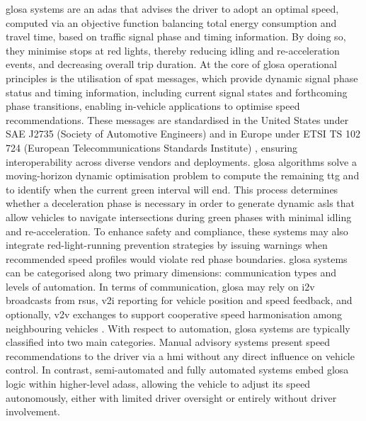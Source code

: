 \ac{glosa} systems are an \ac{adas} that advises the driver to adopt an optimal speed, computed via an objective function balancing total energy consumption and travel time, based on traffic signal phase and timing information. By doing so, they minimise stops at red lights, thereby reducing idling and re-acceleration events, and decreasing overall trip duration. \cite{RealTimeGLOSA2020}
\mynewline
At the core of \ac{glosa} operational principles is the utilisation of \ac{spat} messages, which provide dynamic signal phase status and timing information, including current signal states and forthcoming phase transitions, enabling in-vehicle applications to optimise speed recommendations. These messages are standardised in the United States under SAE J2735 (Society of Automotive Engineers) \cite{USDOTSPaT2022} and in Europe under ETSI TS 102 724 (European Telecommunications Standards Institute) \cite{ETSI1027242012}, ensuring interoperability across diverse vendors and deployments. \ac{glosa} algorithms solve a moving-horizon dynamic optimisation problem to compute the remaining \ac{ttg} and to identify when the current green interval will end. This process determines whether a deceleration phase is necessary in order to generate dynamic \acp{asl} that allow vehicles to navigate intersections during green phases with minimal idling and re-acceleration. To enhance safety and compliance, these systems may also integrate red-light-running prevention strategies by issuing warnings when recommended speed profiles would violate red phase boundaries. \cite{BusesGLOSA2022}
\mynewline
\ac{glosa} systems can be categorised along two primary dimensions: communication types and levels of automation. In terms of communication, \ac{glosa} may rely on \ac{i2v} broadcasts from \acp{rsu}, \ac{v2i} reporting for vehicle position and speed feedback, and optionally, \ac{v2v} exchanges to support cooperative speed harmonisation among neighbouring vehicles \cite{Seredynski2013}. With respect to automation, \ac{glosa} systems are typically classified into two main categories. Manual advisory systems present speed recommendations to the driver via a \ac{hmi} without any direct influence on vehicle control. \cite{BusesGLOSA2022} In contrast, semi-automated and fully automated systems embed \ac{glosa} logic within higher-level \acp{adas}, allowing the vehicle to adjust its speed autonomously, either with limited driver oversight or entirely without driver involvement. \cite{Almannaa2019}
\mynewline

